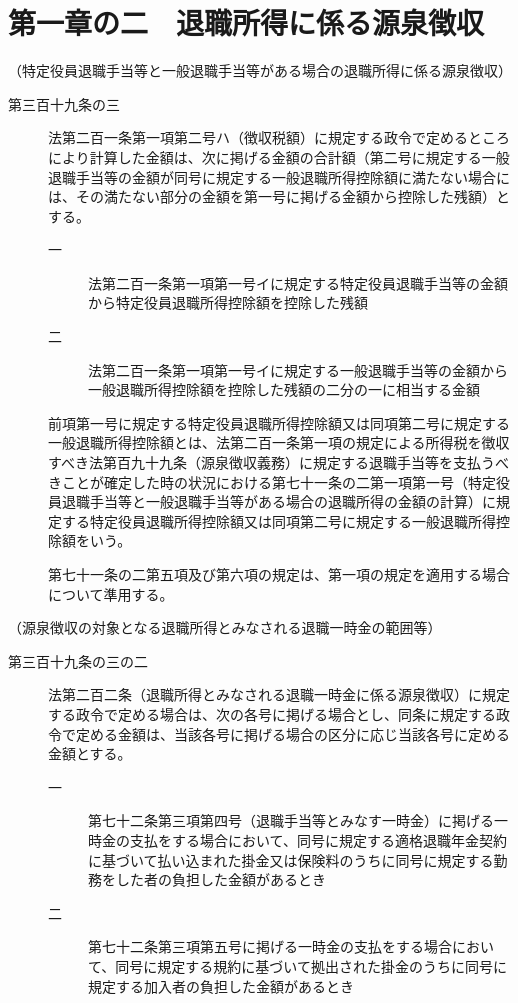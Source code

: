 \documentclass[twocolumn,a4j,10pt]{ltjtarticle}
\begin{document}
\section*{第一章の二　退職所得に係る源泉徴収}
\noindent\hspace{10pt}（特定役員退職手当等と一般退職手当等がある場合の退職所得に係る源泉徴収）
\begin{description}
\item[第三百十九条の三]法第二百一条第一項第二号ハ（徴収税額）に規定する政令で定めるところにより計算した金額は、次に掲げる金額の合計額（第二号に規定する一般退職手当等の金額が同号に規定する一般退職所得控除額に満たない場合には、その満たない部分の金額を第一号に掲げる金額から控除した残額）とする。
\begin{description}
\item[一]法第二百一条第一項第一号イに規定する特定役員退職手当等の金額から特定役員退職所得控除額を控除した残額
\item[二]法第二百一条第一項第一号イに規定する一般退職手当等の金額から一般退職所得控除額を控除した残額の二分の一に相当する金額
\end{description}
\item[]前項第一号に規定する特定役員退職所得控除額又は同項第二号に規定する一般退職所得控除額とは、法第二百一条第一項の規定による所得税を徴収すべき法第百九十九条（源泉徴収義務）に規定する退職手当等を支払うべきことが確定した時の状況における第七十一条の二第一項第一号（特定役員退職手当等と一般退職手当等がある場合の退職所得の金額の計算）に規定する特定役員退職所得控除額又は同項第二号に規定する一般退職所得控除額をいう。
\item[]第七十一条の二第五項及び第六項の規定は、第一項の規定を適用する場合について準用する。
\end{description}
\noindent\hspace{10pt}（源泉徴収の対象となる退職所得とみなされる退職一時金の範囲等）
\begin{description}
\item[第三百十九条の三の二]法第二百二条（退職所得とみなされる退職一時金に係る源泉徴収）に規定する政令で定める場合は、次の各号に掲げる場合とし、同条に規定する政令で定める金額は、当該各号に掲げる場合の区分に応じ当該各号に定める金額とする。
\begin{description}
\item[一]第七十二条第三項第四号（退職手当等とみなす一時金）に掲げる一時金の支払をする場合において、同号に規定する適格退職年金契約に基づいて払い込まれた掛金又は保険料のうちに同号に規定する勤務をした者の負担した金額があるとき
\item[二]第七十二条第三項第五号に掲げる一時金の支払をする場合において、同号に規定する規約に基づいて拠出された掛金のうちに同号に規定する加入者の負担した金額があるとき
\end{description}
\end{description}
\end{document}
